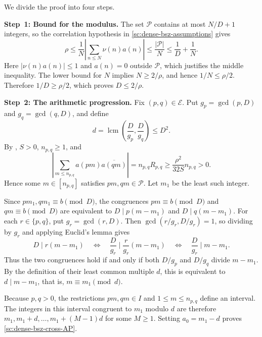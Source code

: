 \documentclass[twoside]{aomart}
\makeatletter
\theoremstyle{paperplain}
\theoremstyle{paperdefinition}
\renewenvironment{proof}[1][\proofname]{\par\pushQED{\qed}%
  \normalfont\topsep6\p@\@plus3\p@\relax\trivlist
  \item[\hskip\labelsep\itshape #1\@addpunct{.}]\ignorespaces
}{\popQED\endtrivlist\@endpefalse}
\numberwithin{equation}{section}
\makeatother
\begin{document}
\begin{proof}
We divide the proof into four steps.	
	
\par
\medskip
\noindent\textbf{Step~1: Bound for the modulus.}
The set $\mathcal P$ contains at most $N/D+1$ integers, so the
correlation hypothesis in \eqref{sc:dense-bsz-assumptions} gives
\begin{equation*}
 \rho\le\frac1N\left|\sum_{n\le N}\nu(n)a(n)\right|
 \le\frac{|\mathcal P|}{N}\le\frac1D+\frac1N.
 \end{equation*}
Here $|\nu(n)a(n)|\le1$ and $a(n)=0$ outside $\mathcal P$,
which justifies the middle inequality. The lower bound for $N$
implies $N\ge2/\rho$, and hence
$1/N\le\rho/2$. Therefore $1/D\ge\rho/2$, which proves
$D\le2/\rho$.

\par
\medskip
\noindent\textbf{Step~2: The arithmetic progression.}
Fix $(p,q)\in\mathcal E$. Put $g_p=\gcd(p,D)$ and
$g_q=\gcd(q,D)$, and define
\begin{equation*}
 d=\operatorname{lcm}\left(\frac D{g_p},\frac D{g_q}\right)
 \le D^2.
 \end{equation*}
By , $S>0$, $n_{p,q}\ge1$, and
\begin{equation}
 \left|\sum_{m\le n_{p,q}}a(pm)\overline{a(qm)}\right|
 =n_{p,q}R_{p,q}
 \ge\frac{\rho^2}{32S}n_{p,q}>0.
 \label{sc:cross-progression-nonempty}
\end{equation}
Hence some $m\in[n_{p,q}]$ satisfies $pm,qm\in\mathcal P$.
Let $m_1$ be the least such integer.

Since $pm_1,qm_1\equiv b\pmod D$, the congruences
$pm\equiv b\pmod D$ and $qm\equiv b\pmod D$ are equivalent to
$D\mid p(m-m_1)$ and $D\mid q(m-m_1)$.
For each $r\in\{p,q\}$, put $g_r=\gcd(r,D)$.
Then $\gcd(r/g_r,D/g_r)=1$, so dividing by $g_r$ and applying
Euclid's lemma gives
\begin{equation*}
 D\mid r(m-m_1)
 \quad\Longleftrightarrow\quad
 \frac D{g_r}\mid\frac r{g_r}(m-m_1)
 \quad\Longleftrightarrow\quad
 \frac D{g_r}\mid m-m_1.
 \end{equation*}
Thus the two congruences hold if and only if both $D/g_p$ and
$D/g_q$ divide $m-m_1$. By the definition of their least common
multiple $d$, this is equivalent to $d\mid m-m_1$, that is,
$m\equiv m_1\pmod d$.

Because $p,q>0$, the restrictions $pm,qm\in I$ and
$1\le m\le n_{p,q}$ define an interval.
The integers in this interval congruent to $m_1$ modulo $d$
are therefore $m_1,m_1+d,\ldots,m_1+(M-1)d$ for some $M\ge1$.
Setting $a_0=m_1-d$ proves \eqref{sc:dense-bsz-cross-AP}.


\end{proof}
\end{document}

